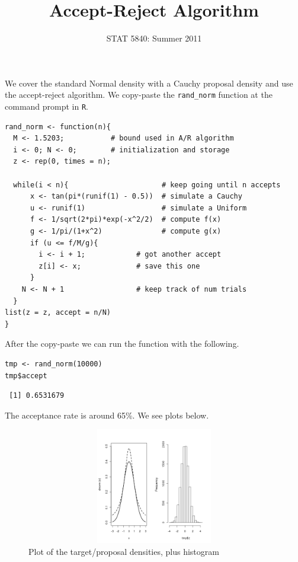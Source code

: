 \documentclass[11pt,english]{article}
\title{Accept-Reject Algorithm}
\date{STAT 5840: Summer 2011}
\begin{document}
\maketitle

\thispagestyle{empty}

We cover the standard Normal density with a Cauchy proposal density and use the accept-reject algorithm.  We copy-paste the \texttt{rand\_norm} function at the command prompt in \texttt{R}.


\begin{verbatim}
rand_norm <- function(n){
  M <- 1.5203;           # bound used in A/R algorithm
  i <- 0; N <- 0;        # initialization and storage
  z <- rep(0, times = n);

  while(i < n){                      # keep going until n accepts
      x <- tan(pi*(runif(1) - 0.5))  # simulate a Cauchy
      u <- runif(1)                  # simulate a Uniform
      f <- 1/sqrt(2*pi)*exp(-x^2/2)  # compute f(x)
      g <- 1/pi/(1+x^2)              # compute g(x)
      if (u <= f/M/g){
        i <- i + 1;            # got another accept
        z[i] <- x;             # save this one
      }
    N <- N + 1                 # keep track of num trials
  }
list(z = z, accept = n/N)                     
}
\end{verbatim}



After the copy-paste we can run the function with the following.

\begin{verbatim}
tmp <- rand_norm(10000)
tmp$accept
\end{verbatim}




\begin{verbatim}
 [1] 0.6531679
\end{verbatim}


The acceptance rate is around 65\%.  We see plots below.



\begin{figure}[h!]
\centering
\includegraphics[width=5in, height=2in,]{ARalgo.png}
\caption{\label{fig:yplot}Plot of the target/proposal densities, plus histogram}
\end{figure}
\end{document}
